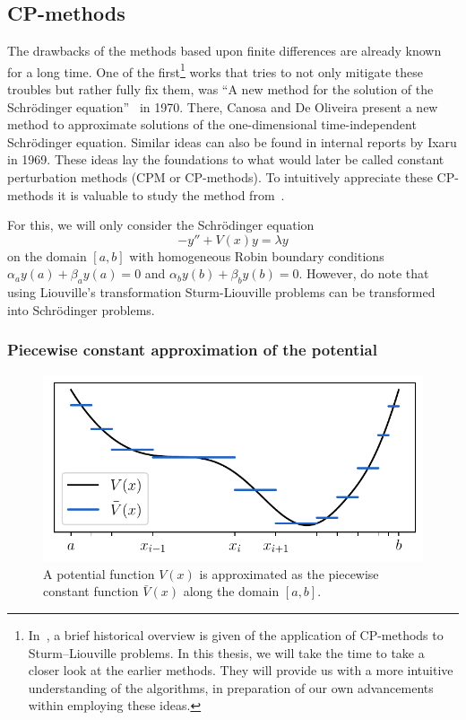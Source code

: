 \subsection{CP-methods}

The drawbacks of the methods based upon finite differences are already known for a long time. One of the first\footnote{In~\cite{ledoux_solving_2010}, a brief historical overview is given of the application of CP-methods to Sturm--Liouville problems. In this thesis, we will take the time to take a closer look at the earlier methods. They will provide us with a more intuitive understanding of the algorithms, in preparation of our own advancements within employing these ideas.} works that tries to not only mitigate these troubles but rather fully fix them, was ``A new method for the solution of the Schrödinger equation''~\cite{canosa_new_1970} in 1970. There, Canosa and De Oliveira present a new method to approximate solutions of the one-dimensional time-independent Schrödinger equation. Similar ideas can also be found in internal reports \cite{ixaru_algebraic_1969,ixaru_algebraic_1969a}  by Ixaru in 1969. These ideas lay the foundations to what would later be called constant perturbation methods (CPM or CP-methods). To intuitively appreciate these CP-methods it is valuable to study the method from~\cite{canosa_new_1970}.

For this, we will only consider the Schrödinger equation
\begin{equation}\label{equ:c2_cpm_schrodinger}
    - y'' + V(x) y = \lambda y
\end{equation}
on the domain $[a, b]$ with homogeneous Robin boundary conditions $\alpha_a y(a) + \beta_a y(a) = 0$ and $\alpha_b y(b) + \beta_b y(b) = 0$. However, do note that using Liouville's transformation Sturm-Liouville problems can be transformed into Schrödinger problems.

\subsubsection{Piecewise constant approximation of the potential}

\begin{figure}
    \begin{center}
        \includegraphics[width=\textwidth]{img/chapter2/cpm_constant_approx.pdf}
        \caption{A potential function $V(x)$ is approximated as the piecewise constant function $\bar{V}(x)$ along the domain $[a, b]$.}
        \label{fig:c2_cpm_constant_approx}
    \end{center}
\end{figure}

